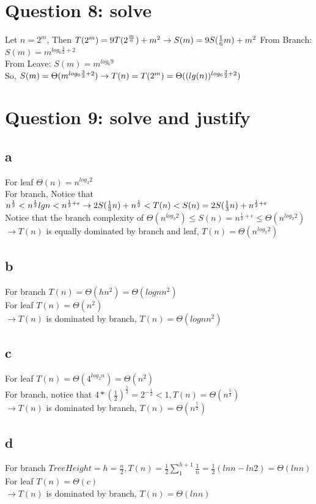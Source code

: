 \documentclass[]{article}
\begin{document}
\section{Question 8: solve}
Let $n = 2^m$, Then $T(2^m) = 9T(2^{\frac{m}{6}}) + m^2\\
\rightarrow S(m) = 9S(\frac{1}{6}m) + m^2\\$
From Branch: $S(m) = m^{log_{6}\frac{3}{2} + 2}$\\
From Leave: $S(m) = m^{log_{6}9}$\\
So, $S(m) = \Theta (m^{log_{6}\frac{3}{2} + 2}) \\
\rightarrow T(n) = T(2^m) = \Theta((lg(n))^{log_{6}\frac{3}{2} + 2})$

\section{Question 9: solve and justify}
\subsection{a}
For leaf $\Theta(n) = n^{log_{3}2}$\\
For branch, Notice that $n^{\frac{1}{2}} <n^{\frac{1}{2}}lgn < n^{\frac{1}{2} + \epsilon}\\
\rightarrow 2S(\frac{1}{3}n) + n^{\frac{1}{2}} < T(n) < S(n) = 2S(\frac{1}{3}n) + n^{\frac{1}{2} + \epsilon}$\\
Notice that the branch complexity of $\Theta(n^{log_{3}2}) \le S(n) = n^{\frac{1}{2}+\epsilon} \le \Theta(n^{log_{3}2})$\\
$\rightarrow T(n)$ is equally dominated by branch and leaf, $T(n) = \Theta(n^{log_{3}2})$


\subsection{b}
For branch $T(n) = \Theta(hn^2) = \Theta(lognn^2)$\\
For leaf $T(n) = \Theta(n^2)$\\
$\rightarrow T(n)$ is dominated by branch, $T(n) =\Theta(lognn^2)$

\subsection{c}
For leaf $T(n) = \Theta(4^{log_{2}n}) = \Theta(n^2)$\\
For branch, notice that $4*(\frac{1}{2})^{\frac{5}{2}} = 2^{-\frac{1}{2}} < 1, T(n) = \Theta(n^{\frac{5}{2}})$\\
$\rightarrow T(n)$ is dominated by branch, $T(n) =\Theta(n^{\frac{5}{2}})$

\subsection{d}
For branch $TreeHeight = h = \frac{n}{2}, T(n) = \frac{1}{2}\sum_{1}^{h + 1} \frac{1}{n} = \frac{1}{2}(lnn-ln2) = \Theta(lnn)$\\
For leaf $T(n) = \Theta(c)$\\
$\rightarrow T(n)$ is dominated by branch, $T(n) =\Theta(lnn)$
\end{document}

